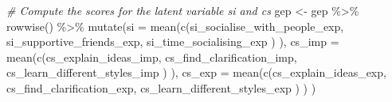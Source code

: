 \documentclass[
]{book}
\newenvironment{Shaded}{\begin{snugshade}}{\end{snugshade}}
\newcommand{\AttributeTok}[1]{\textcolor[rgb]{0.77,0.63,0.00}{#1}}
\newcommand{\CommentTok}[1]{\textcolor[rgb]{0.56,0.35,0.01}{\textit{#1}}}
\newcommand{\FunctionTok}[1]{\textcolor[rgb]{0.00,0.00,0.00}{#1}}
\newcommand{\NormalTok}[1]{#1}
\newcommand{\OtherTok}[1]{\textcolor[rgb]{0.56,0.35,0.01}{#1}}
\newcommand{\SpecialCharTok}[1]{\textcolor[rgb]{0.00,0.00,0.00}{#1}}
\begin{document}
\begin{Shaded}
\begin{Highlighting}[]
\CommentTok{\# Compute the scores for the latent variable \textquotesingle{}si\textquotesingle{} and \textquotesingle{}cs\textquotesingle{}}
\NormalTok{gep }\OtherTok{\textless{}{-}}\NormalTok{ gep }\SpecialCharTok{\%\textgreater{}\%} 
  \FunctionTok{rowwise}\NormalTok{() }\SpecialCharTok{\%\textgreater{}\%} 
  \FunctionTok{mutate}\NormalTok{(}\AttributeTok{si =} \FunctionTok{mean}\NormalTok{(}\FunctionTok{c}\NormalTok{(si\_socialise\_with\_people\_exp,}
\NormalTok{                     si\_supportive\_friends\_exp,}
\NormalTok{                     si\_time\_socialising\_exp}
\NormalTok{                     )}
\NormalTok{                   ),}
         \AttributeTok{cs\_imp =} \FunctionTok{mean}\NormalTok{(}\FunctionTok{c}\NormalTok{(cs\_explain\_ideas\_imp,}
\NormalTok{                         cs\_find\_clarification\_imp,}
\NormalTok{                         cs\_learn\_different\_styles\_imp}
\NormalTok{                         )}
\NormalTok{                       ),}
         \AttributeTok{cs\_exp =} \FunctionTok{mean}\NormalTok{(}\FunctionTok{c}\NormalTok{(cs\_explain\_ideas\_exp,}
\NormalTok{                         cs\_find\_clarification\_exp,}
\NormalTok{                         cs\_learn\_different\_styles\_exp}
\NormalTok{                         )}
\NormalTok{                       )}
\NormalTok{         )}


\end{Highlighting}
\end{Shaded}
\end{document}
